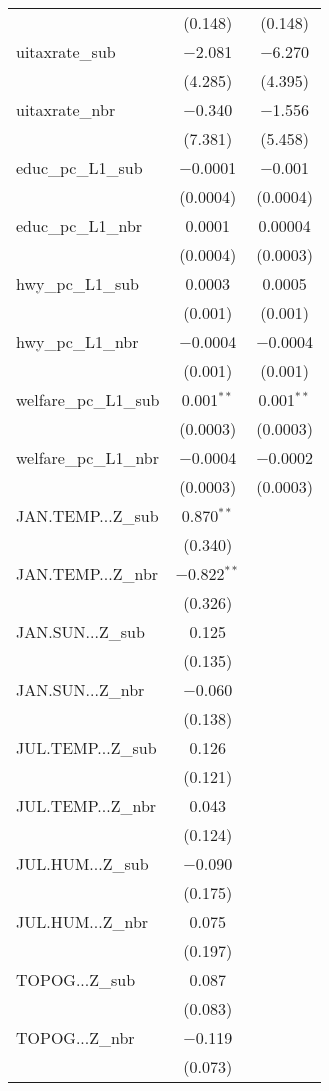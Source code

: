 \begin{table}[!htbp]
\begin{tabular}{@{\extracolsep{5pt}}lcc}
  & (0.148) & (0.148) \\ 
  uitaxrate\_sub & $-$2.081 & $-$6.270 \\ 
  & (4.285) & (4.395) \\ 
  uitaxrate\_nbr & $-$0.340 & $-$1.556 \\ 
  & (7.381) & (5.458) \\ 
  educ\_pc\_L1\_sub & $-$0.0001 & $-$0.001 \\ 
  & (0.0004) & (0.0004) \\ 
  educ\_pc\_L1\_nbr & 0.0001 & 0.00004 \\ 
  & (0.0004) & (0.0003) \\ 
  hwy\_pc\_L1\_sub & 0.0003 & 0.0005 \\ 
  & (0.001) & (0.001) \\ 
  hwy\_pc\_L1\_nbr & $-$0.0004 & $-$0.0004 \\ 
  & (0.001) & (0.001) \\ 
  welfare\_pc\_L1\_sub & 0.001$^{**}$ & 0.001$^{**}$ \\ 
  & (0.0003) & (0.0003) \\ 
  welfare\_pc\_L1\_nbr & $-$0.0004 & $-$0.0002 \\ 
  & (0.0003) & (0.0003) \\ 
  JAN.TEMP...Z\_sub & 0.870$^{**}$ &  \\ 
  & (0.340) &  \\ 
  JAN.TEMP...Z\_nbr & $-$0.822$^{**}$ &  \\ 
  & (0.326) &  \\ 
  JAN.SUN...Z\_sub & 0.125 &  \\ 
  & (0.135) &  \\ 
  JAN.SUN...Z\_nbr & $-$0.060 &  \\ 
  & (0.138) &  \\ 
  JUL.TEMP...Z\_sub & 0.126 &  \\ 
  & (0.121) &  \\ 
  JUL.TEMP...Z\_nbr & 0.043 &  \\ 
  & (0.124) &  \\ 
  JUL.HUM...Z\_sub & $-$0.090 &  \\ 
  & (0.175) &  \\ 
  JUL.HUM...Z\_nbr & 0.075 &  \\ 
  & (0.197) &  \\ 
  TOPOG...Z\_sub & 0.087 &  \\ 
  & (0.083) &  \\ 
  TOPOG...Z\_nbr & $-$0.119 &  \\ 
  & (0.073) &  \\ 

\end{tabular}
\end{table}
